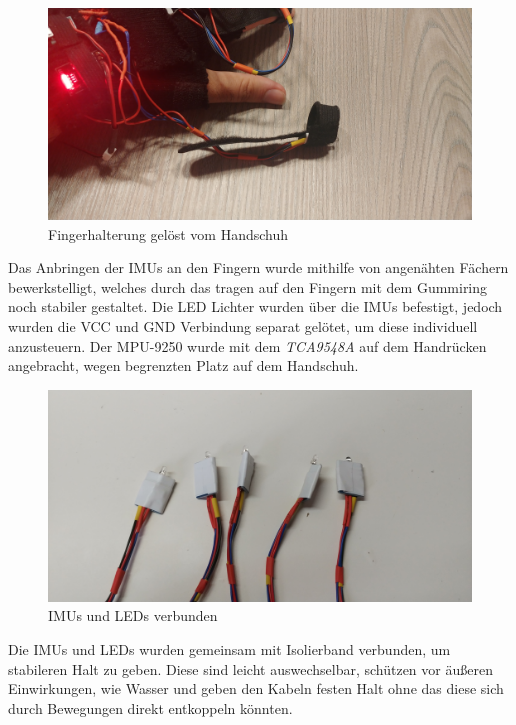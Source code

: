 \begin{figure}[h]
	\centering
    \includegraphics[width=1\columnwidth]{Bachelorarbeit/images/Extractable.jpg}
    \caption{Fingerhalterung gelöst vom Handschuh}
    \label{fig:Extractable}
\end{figure}


Das Anbringen der IMUs an den Fingern wurde mithilfe von angenähten Fächern bewerkstelligt, welches durch das tragen auf den Fingern mit dem Gummiring noch stabiler gestaltet. Die LED Lichter wurden über die IMUs befestigt, jedoch wurden die VCC und GND Verbindung separat gelötet, um diese individuell anzusteuern. Der MPU-9250 wurde mit dem \textit{TCA9548A} auf dem Handrücken angebracht, wegen begrenzten Platz auf dem Handschuh. 

\begin{figure}[h]
	\centering
    \includegraphics[width=1\columnwidth]{Bachelorarbeit/images/IMUswithLEDs.jpg}
    \caption{IMUs und LEDs verbunden}
    \label{fig:IMUSolo}
\end{figure}
Die IMUs und LEDs wurden gemeinsam mit Isolierband verbunden, um stabileren Halt zu geben. Diese sind leicht auswechselbar, schützen vor äußeren Einwirkungen, wie Wasser und geben den Kabeln festen Halt ohne das diese sich durch Bewegungen direkt entkoppeln könnten. 

